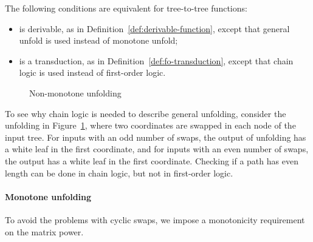 \begin{theorem}\label{thm:chain-transductions}
    The following conditions are equivalent for tree-to-tree functions:
\begin{itemize}
    \item is derivable, as in Definition~\ref{def:derivable-function}, except that general unfold is used instead of monotone unfold;
    \item is a transduction,  as in  Definition~\ref{def:fo-transduction},  except that chain logic is used instead of first-order logic. 
\end{itemize}
\end{theorem}

\begin{figure}
    \caption{Non-monotone unfolding}
    \label{fig:non-monotone}
\end{figure}



 To see why chain logic is needed to describe general unfolding, consider the unfolding in Figure~\ref{fig:non-monotone}, where two coordinates are swapped in each node of the input tree.
For inputs with an odd number of swaps, the output of unfolding has a white leaf in the first coordinate, and for inputs with an even number of swaps, the output has a white leaf in the first coordinate.  Checking if a path has even length can be done in chain logic, but not in  first-order logic.  

\paragraph*{Monotone unfolding}
To avoid the problems with cyclic swaps, we impose a monotonicity requirement on the matrix power. 


